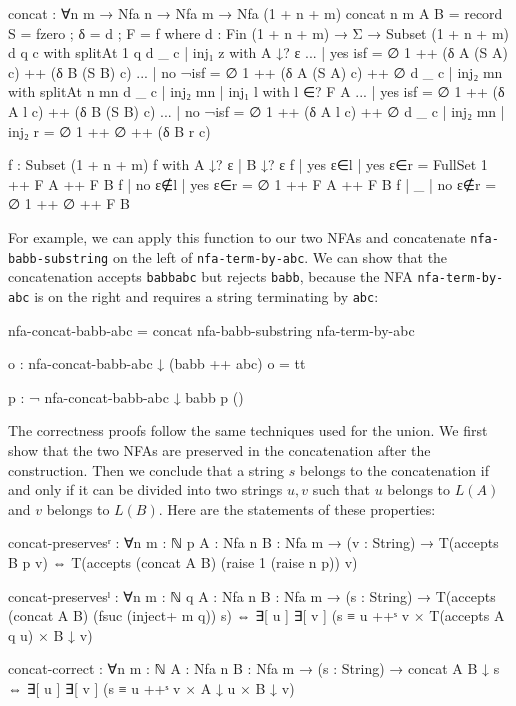 \begin{agda}
concat : ∀{n m} → Nfa n → Nfa m → Nfa (1 + n + m)
concat {n} {m} A B =
  record
    { S = fzero
    ; δ = d
    ; F = f
    }
  where
    d : Fin (1 + n + m) → Σ → Subset (1 + n + m)
    d q c with splitAt 1 q
    d _ c | inj₁ z with A ↓? ε
    ... | yes isf = ∅ {1} ++ (δ A (S A) c) ++ (δ B (S B) c)
    ... | no ¬isf = ∅ {1} ++ (δ A (S A) c) ++ ∅
    d _ c | inj₂ mn with splitAt n mn
    d _ c | inj₂ mn | inj₁ l with l ∈? F A
    ... | yes isf = ∅ {1} ++ (δ A l c) ++ (δ B (S B) c)
    ... | no ¬isf = ∅ {1} ++ (δ A l c) ++  ∅
    d _ c | inj₂ mn | inj₂ r = ∅ {1} ++ ∅ ++ (δ B r c)

    f : Subset (1 + n + m)
    f with A ↓? ε | B ↓? ε
    f | yes ε∈l | yes ε∈r = FullSet {1} ++ F A ++ F B
    f | no ε∉l | yes ε∈r = ∅ {1} ++ F A ++ F B
    f | _ | no ε∉r = ∅ {1} ++ ∅ ++ F B
\end{agda}
For example, we can apply this function to our two NFAs and concatenate \texttt{nfa-babb-substring} on the left of \texttt{nfa-term-by-abc}. We can show that the concatenation accepts \texttt{babbabc} but rejects \texttt{babb}, because the NFA \texttt{nfa-term-by-abc} is on the right and requires a string terminating by \texttt{abc}:
\begin{agda}
nfa-concat-babb-abc = concat nfa-babb-substring nfa-term-by-abc

o : nfa-concat-babb-abc ↓ (babb ++ abc)
o = tt

p : ¬ nfa-concat-babb-abc ↓ babb
p ()
\end{agda}
The correctness proofs follow the same techniques used for the union. We first show that the two NFAs are preserved in the concatenation after the construction. Then we conclude that a string $s$ belongs to the concatenation if and only if it can be divided into two strings $u,v$ such that $u$ belongs to $L(A)$ and $v$ belongs to $L(B)$. Here are the statements of these properties:
\begin{agda}
concat-preservesʳ : ∀{n m : ℕ} {p} {A : Nfa n} {B : Nfa m}
  → (v : String)
  → T(accepts B p v)
    ⇔
    T(accepts (concat A B) (raise 1 (raise n p)) v)
    
concat-preservesˡ : ∀{n m : ℕ} {q} {A : Nfa n} {B : Nfa m}
  → (s : String)
  → T(accepts (concat A B) (fsuc (inject+ m q)) s)
    ⇔
    ∃[ u ] ∃[ v ] (s ≡ u ++ˢ v × T(accepts A q u) × B ↓ v)

concat-correct : ∀{n m : ℕ} {A : Nfa n} {B : Nfa m}
  → (s : String)
  → concat A B ↓ s
    ⇔
    ∃[ u ] ∃[ v ] (s ≡ u ++ˢ v × A ↓ u × B ↓ v)
\end{agda}
